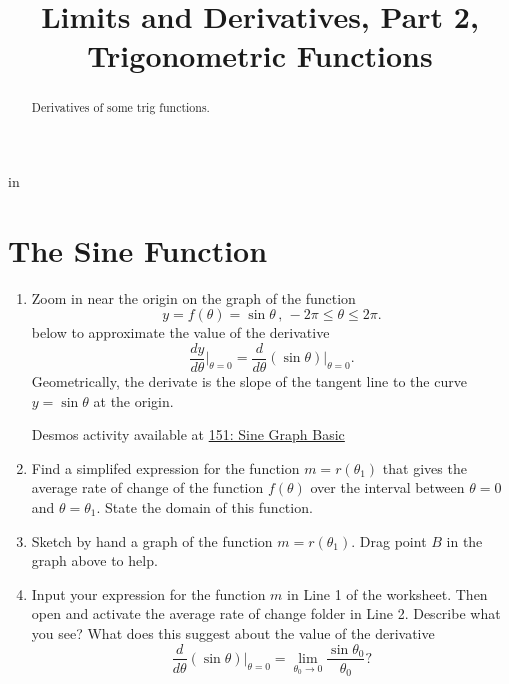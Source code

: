 \documentclass{ximera}
\title{Limits and Derivatives, Part 2, Trigonometric Functions}
\newcommand{\pskip}{\vskip 0.1 in}
\begin{document}
\begin{abstract}
Derivatives of some trig functions.
\end{abstract}
\maketitle


\pskip

\section{The Sine Function}

\begin{example}  \label{Ex:9u4erdfg9}
\begin{enumerate}
\item Zoom in near the origin on the graph of the function
\[
   y = f(\theta) = \sin\theta \, , \, -2\pi \leq \theta \leq 2\pi.
\]
below to approximate the value of the derivative
\[
     \frac{dy}{d\theta}\Big|_{\theta = 0}  =   \frac{d}{d\theta} \left( \sin \theta \right)\Big|_{\theta = 0} .
\]
Geometrically, the derivate is the slope of the tangent line to the curve $y=\sin\theta$ at the origin.


\begin{onlineOnly}
    \begin{center}
\end{center}
\end{onlineOnly}

Desmos activity available at
\href{https://www.desmos.com/calculator/ordzgkr1za}{151: Sine Graph Basic}

\item Find a simplifed expression for the function $m=r(\theta_1)$ that gives the average rate of change of the function $f(\theta)$ over the interval between $\theta = 0$ and $\theta = \theta_1$. State the domain of this function.

\item Sketch by hand a graph of the function $m=r(\theta_1)$. Drag point $B$ in the graph above to help.

\item Input your expression for the function $m$ in Line 1 of the worksheet. Then open and activate the average rate of change folder in Line 2. Describe what you see? What does this suggest about the value of the derivative
\[
   \frac{d}{d\theta} \left( \sin \theta \right)\Big|_{\theta = 0} = \lim_{\theta_0 \to 0} \frac{\sin\theta_0}{\theta_0} ?
\]

\end{enumerate}

\end{example}
\end{document}
